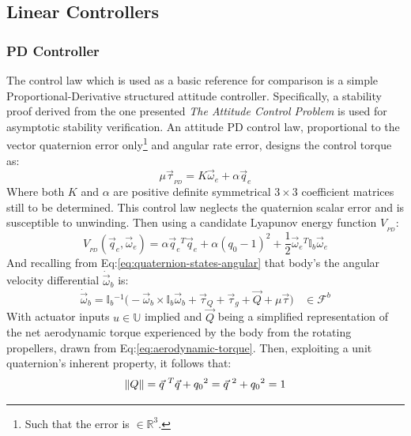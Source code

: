 \subsection{Linear Controllers}
\label{subsec:control.attitude.controllers}
\subsubsection{PD Controller}
\label{subsubsec:control.attitude.controllers.pd}
The control law which is used as a basic reference for comparison is a simple Proportional-Derivative structured attitude controller. Specifically, a stability proof derived from the one presented \emph{The Attitude Control Problem}\cite{attitudecontrolproblem} is used for asymptotic stability verification. An attitude PD control law, proportional to the vector quaternion error only\footnote{Such that the error is $\in\mathbb{R}^3$.} and angular rate error, designs the control torque as:
\begin{equation}\label{eq:independent-pd}
\mu\vec{\tau}_{_{PD}}=K\vec{\omega}_e+\alpha\vec{q}_e
\end{equation}
Where both $K$ and $\alpha$ are positive definite symmetrical $3\times 3$ coefficient matrices still to be determined. This control law neglects the quaternion scalar error and is susceptible to unwinding. Then using a candidate Lyapunov energy function $V_{_{PD}}$:
\begin{equation}\label{eq:lyapunov-pd}
V_{_{PD}}(\vec{q}_e,\vec{\omega}_e)=\alpha\vec{q}_e\text{}^T\vec{q}_e+\alpha(q_0-1)^2+\frac{1}{2}\vec{\omega}_e\text{}^T\mathbb{I}_b\vec{\omega}_e
\end{equation}
And recalling from Eq:\ref{eq:quaternion-states-angular} that body's the angular velocity differential $\dot{\vec{\omega}}_b$ is:
\begin{equation}
\dot{\vec{\omega}}_b=\mathbb{I}_b\text{}^{-1}\big(-\vec{\omega}_b\times\mathbb{I}_b\vec{\omega}_b+\vec{\tau}_Q+\vec{\tau}_g+\vec{Q}+\mu\vec{\tau}\big)~~~~\in\mathcal{F}^b
\end{equation}
With actuator inputs $u\in\mathbb{U}$ implied and $\vec{Q}$ being a simplified representation of the net aerodynamic torque experienced by the body from the rotating propellers, drawn from Eq:\ref{eq:aerodynamic-torque}. Then, exploiting a unit quaternion's inherent property, it follows that:
\begin{equation}\label{eq:4.17}
\left\lVert Q\right\rVert=\vec{q}\text{}^{\hspace{3pt}T}\vec{q}+q_0\text{}^2=\vec{q}\text{}^{\hspace{3pt}2}+q_0\text{}^2=1
\end{equation}
